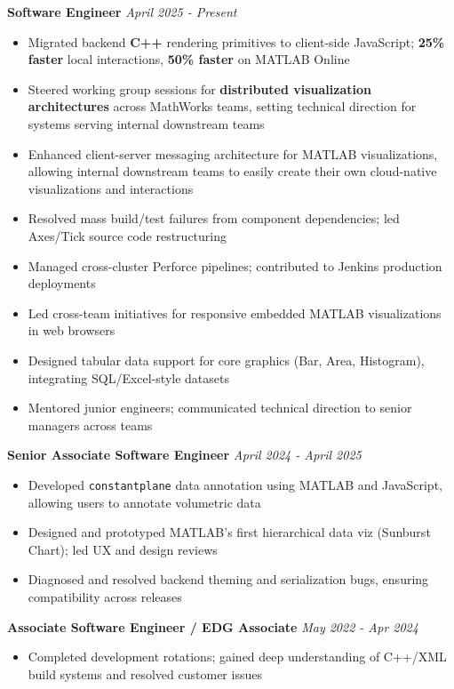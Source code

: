 \documentclass{article}
\begin{document}
{\large \textbf{Software Engineer}} \hfill \textit{April 2025 - Present}
\begin{itemize}[leftmargin=*]
    \item Migrated backend \textbf{C++} rendering primitives to client-side JavaScript; \textbf{25\% faster} local interactions, \textbf{50\% faster} on MATLAB Online
    \item Steered working group sessions for \textbf{distributed visualization architectures} across MathWorks teams, setting technical direction for systems serving internal downstream teams
    \item Enhanced client-server messaging architecture for MATLAB visualizations, allowing internal downstream teams to easily create their own cloud-native visualizations and interactions
    \item Resolved mass build/test failures from component dependencies; led Axes/Tick source code restructuring
    \item Managed cross-cluster Perforce pipelines; contributed to Jenkins production deployments
    \item Led cross-team initiatives for responsive embedded MATLAB visualizations in web browsers
    \item Designed tabular data support for core graphics (Bar, Area, Histogram), integrating SQL/Excel-style datasets
    \item Mentored junior engineers; communicated technical direction to senior managers across teams
\end{itemize}

{\large \textbf{Senior Associate Software Engineer}} \hfill \textit{April 2024 - April 2025}
\begin{itemize}[leftmargin=*]
    \item Developed \texttt{constantplane} data annotation using MATLAB and JavaScript, allowing users to annotate volumetric data
    \item Designed and prototyped MATLAB's first hierarchical data viz (Sunburst Chart); led UX and design reviews
    \item Diagnosed and resolved backend theming and serialization bugs, ensuring compatibility across releases
\end{itemize}

{\large \textbf{Associate Software Engineer / EDG Associate}} \hfill \textit{May 2022 - Apr 2024}
\begin{itemize}[leftmargin=*]
    \item Completed development rotations; gained deep understanding of C++/XML build systems and resolved customer issues
\end{itemize}
\end{document}
